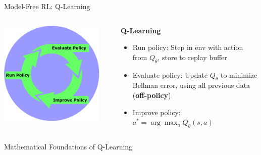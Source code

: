 \documentclass[9pt]{beamer}
\begin{document}
\begin{frame}{Model-Free RL: Q-Learning}


\begin{columns}
\begin{column}{0.33\textwidth}
\includegraphics[width=0.9\textwidth]{rl_loop}
\end{column}
\begin{column}{0.67\textwidth}
\textbf{Q-Learning}
\begin{itemize}
\item Run policy: Step in env with action from $Q_{\theta}$, store to replay buffer
\item Evaluate policy: Update $Q_{\theta}$ to minimize Bellman error, using all previous data (\textbf{off-policy})
\item Improve policy: $a^* = \arg \max_{a} Q_{\theta}(s,a)$
\end{itemize}
\end{column}
\end{columns}
\end{frame}


\begin{frame}{Mathematical Foundations of Q-Learning}



\end{frame}
\end{document}
